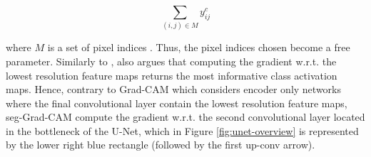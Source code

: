 \documentclass[../main/thesis.tex]{subfiles}
\begin{document}
\begin{equation}
    \sum_{(i,j) \in M} y_{ij}^c
\end{equation}

where $M$ is a set of pixel indices \citep{Vinogradova2020}. Thus, the pixel indices chosen become a free parameter. Similarly to \citet{Selvaraju2016}, \citet{Vinogradova2020} also argues that computing the gradient w.r.t. the lowest resolution feature maps returns the most informative class activation maps. Hence, contrary to Grad-CAM which considers encoder only networks where the final convolutional layer contain the lowest resolution feature maps, seg-Grad-CAM compute the gradient w.r.t. the second convolutional layer located in the bottleneck of the U-Net, which in Figure \ref{fig:unet-overview} is represented by the lower right blue rectangle (followed by the first up-conv arrow).

\biblio
\end{document}
